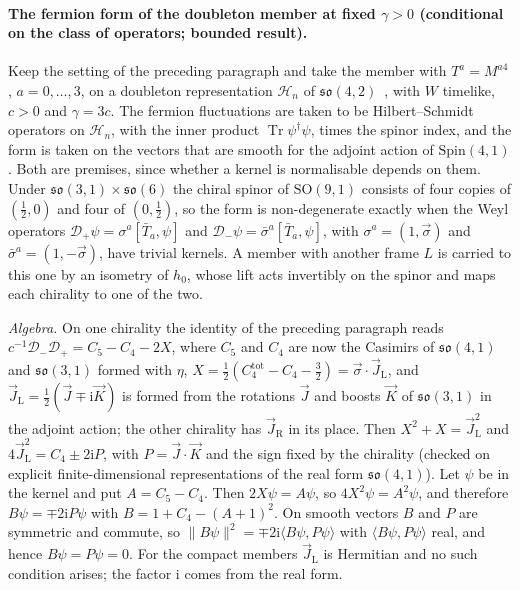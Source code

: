 \paragraph{The fermion form of the doubleton member at fixed \(\gamma>0\) (conditional on the class of operators; bounded result).}
Keep the setting of the preceding paragraph and take the member with \(T^a=M^{a4}\), \(a=0,\dots,3\), on a doubleton representation \(\mathcal H_n\) of \(\mathfrak{so}(4,2)\)~\cite{MantaSteinacker2025}, with \(W\) timelike, \(c>0\) and \(\gamma=3c\). The fermion fluctuations are taken to be Hilbert--Schmidt operators on \(\mathcal H_n\), with the inner product \(\operatorname{Tr}\psi^\dagger\psi\), times the spinor index, and the form is taken on the vectors that are smooth for the adjoint action of \(\mathrm{Spin}(4,1)\). Both are premises, since whether a kernel is normalisable depends on them. Under \(\mathfrak{so}(3,1)\times\mathfrak{so}(6)\) the chiral spinor of \(\mathrm{SO}(9,1)\) consists of four copies of \((\tfrac12,0)\) and four of \((0,\tfrac12)\), so the form is non-degenerate exactly when the Weyl operators \(\mathcal D_+\psi=\sigma^a[\bar T_a,\psi]\) and \(\mathcal D_-\psi=\bar\sigma^a[\bar T_a,\psi]\), with \(\sigma^a=(1,\vec\sigma)\) and \(\bar\sigma^a=(1,-\vec\sigma)\), have trivial kernels. A member with another frame \(L\) is carried to this one by an isometry of \(h_0\), whose lift acts invertibly on the spinor and maps each chirality to one of the two.

\emph{Algebra.} On one chirality the identity of the preceding paragraph reads \(c^{-1}\mathcal D_-\mathcal D_+=C_5-C_4-2X\), where \(C_5\) and \(C_4\) are now the Casimirs of \(\mathfrak{so}(4,1)\) and \(\mathfrak{so}(3,1)\) formed with \(\eta\), \(X=\tfrac12(C_4^{\mathrm{tot}}-C_4-\tfrac32)=\vec\sigma\cdot\vec J_{\mathrm L}\), and \(\vec J_{\mathrm L}=\tfrac12(\vec J\mp\mathrm i\vec K)\) is formed from the rotations \(\vec J\) and boosts \(\vec K\) of \(\mathfrak{so}(3,1)\) in the adjoint action; the other chirality has \(\vec J_{\mathrm R}\) in its place. Then \(X^2+X=\vec J_{\mathrm L}^2\) and \(4\vec J_{\mathrm L}^2=C_4\pm2\mathrm iP\), with \(P=\vec J\cdot\vec K\) and the sign fixed by the chirality (checked on explicit finite-dimensional representations of the real form \(\mathfrak{so}(4,1)\)). Let \(\psi\) be in the kernel and put \(A=C_5-C_4\). Then \(2X\psi=A\psi\), so \(4X^2\psi=A^2\psi\), and therefore \(B\psi=\mp2\mathrm iP\psi\) with \(B=1+C_4-(A+1)^2\). On smooth vectors \(B\) and \(P\) are symmetric and commute, so \(\|B\psi\|^2=\mp2\mathrm i\langle B\psi,P\psi\rangle\) with \(\langle B\psi,P\psi\rangle\) real, and hence \(B\psi=P\psi=0\). For the compact members \(\vec J_{\mathrm L}\) is Hermitian and no such condition arises; the factor \(\mathrm i\) comes from the real form.

